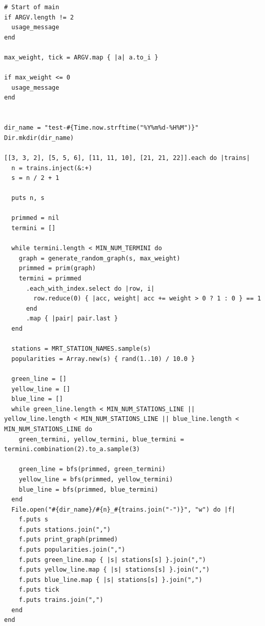 \documentclass[a4paper,12pt]{article}
\begin{document}
\begin{verbatim}
# Start of main
if ARGV.length != 2
  usage_message
end

max_weight, tick = ARGV.map { |a| a.to_i }

if max_weight <= 0
  usage_message
end


dir_name = "test-#{Time.now.strftime("%Y%m%d-%H%M")}"
Dir.mkdir(dir_name)

[[3, 3, 2], [5, 5, 6], [11, 11, 10], [21, 21, 22]].each do |trains|
  n = trains.inject(&:+)
  s = n / 2 + 1

  puts n, s

  primmed = nil
  termini = []

  while termini.length < MIN_NUM_TERMINI do
    graph = generate_random_graph(s, max_weight)
    primmed = prim(graph)
    termini = primmed
      .each_with_index.select do |row, i|
        row.reduce(0) { |acc, weight| acc += weight > 0 ? 1 : 0 } == 1
      end
      .map { |pair| pair.last }
  end

  stations = MRT_STATION_NAMES.sample(s)
  popularities = Array.new(s) { rand(1..10) / 10.0 }

  green_line = []
  yellow_line = []
  blue_line = []
  while green_line.length < MIN_NUM_STATIONS_LINE || yellow_line.length < MIN_NUM_STATIONS_LINE || blue_line.length < MIN_NUM_STATIONS_LINE do
    green_termini, yellow_termini, blue_termini = termini.combination(2).to_a.sample(3)

    green_line = bfs(primmed, green_termini)
    yellow_line = bfs(primmed, yellow_termini)
    blue_line = bfs(primmed, blue_termini)
  end
  File.open("#{dir_name}/#{n}_#{trains.join("-")}", "w") do |f|
    f.puts s
    f.puts stations.join(",")
    f.puts print_graph(primmed)
    f.puts popularities.join(",")
    f.puts green_line.map { |s| stations[s] }.join(",")
    f.puts yellow_line.map { |s| stations[s] }.join(",")
    f.puts blue_line.map { |s| stations[s] }.join(",")
    f.puts tick
    f.puts trains.join(",")
  end
end
\end{verbatim}
\end{document}
